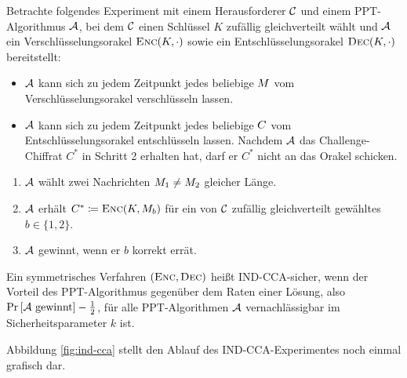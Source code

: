 \begin{definition} Betrachte folgendes Experiment
  mit einem Herausforderer $\mathcal{C}$ und einem PPT-Algorithmus $\mathcal{A}$, bei dem
  $\mathcal{C}$ einen Schlüssel $K$ zufällig gleichverteilt wählt und $\mathcal{A}$ ein
  Verschlüsselungsorakel $\textsc{Enc}(K,\cdot)$ sowie ein
  Entschlüsselungsorakel $\textsc{Dec}(K,\cdot)$ bereitstellt:
  \begin{itemize}
  \item $\mathcal{A}$ kann sich zu jedem Zeitpunkt jedes beliebige
    $M$ vom Verschlüsselungsorakel verschlüsseln lassen.
  \item $\mathcal{A}$ kann sich zu jedem Zeitpunkt jedes beliebige
    $C$ vom Entschlüsselungsorakel entschlüsseln lassen. Nachdem $\mathcal{A}$
    das Challenge-Chiffrat $C^*$ in Schritt 2 erhalten hat, darf er $C^*$
    nicht an das Orakel schicken.
  \end{itemize}
  \begin{enumerate}
  \item $\mathcal{A}$ wählt zwei Nachrichten $M_1 \neq
    M_2$ gleicher Länge.
  \item $\mathcal{A}$ erhält $C^{\ast} \coloneqq \textsc{Enc}(K,
    M_{b})$ für ein von $\mathcal{C}$ zufällig gleichverteilt gewähltes $b \in
    \{1, 2\}$.
  \item $\mathcal{A}$ gewinnt, wenn er $b$ korrekt errät.
  \end{enumerate} Ein symmetrisches Verfahren $(\textsc{Enc}, \textsc{Dec})$ heißt
  IND-CCA-sicher, wenn der Vorteil des PPT-Algorithmus gegenüber dem Raten
  einer Lösung, also $\Pr \left[\mathcal{A} \textnormal{ gewinnt} \right] -
  \frac{1}{2}$, für alle PPT-Algorithmen $\mathcal{A}$ vernachlässigbar im
  Sicherheitsparameter $k$ ist.
\end{definition} Abbildung \ref{fig:ind-cca} stellt den Ablauf des
IND-CCA-Experimentes noch einmal grafisch dar.

